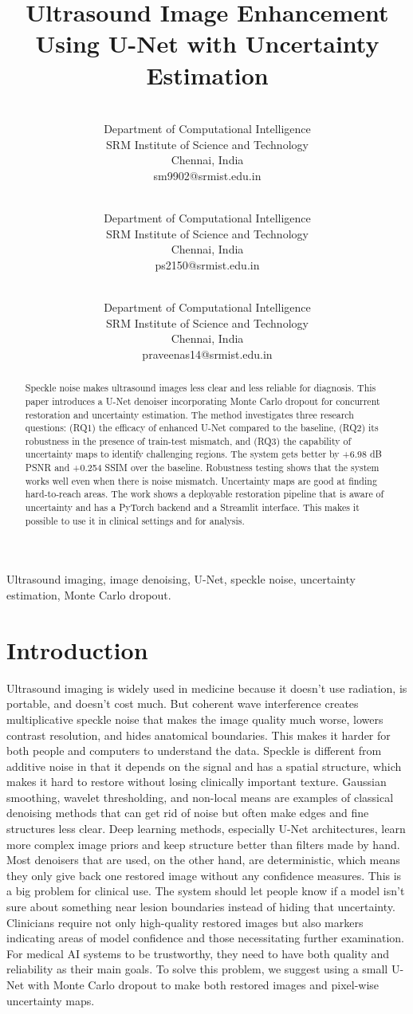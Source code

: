 \documentclass[conference]{IEEEtran}
\title{Ultrasound Image Enhancement Using U-Net with Uncertainty Estimation}
\author{\IEEEauthorblockN{ Swayam Vijay Mehra} \\
{\small Department of Computational Intelligence} \\
{\small SRM Institute of Science and Technology} \\
{\small Chennai, India} \\
{\small sm9902@srmist.edu.in}
\and
\IEEEauthorblockN{ Prateek Shukla} \\
{\small Department of Computational Intelligence} \\
{\small SRM Institute of Science and Technology} \\
{\small Chennai, India} \\
{\small ps2150@srmist.edu.in}
\and
\IEEEauthorblockN{ Praveena S } \\
{\small Department of Computational Intelligence} \\
{\small SRM Institute of Science and Technology} \\
{\small Chennai, India} \\
{\small praveenas14@srmist.edu.in}}
\begin{document}
\maketitle

\begin{abstract}
Speckle noise makes ultrasound images less clear and less reliable for diagnosis. This paper introduces a U-Net denoiser incorporating Monte Carlo dropout for concurrent restoration and uncertainty estimation. The method investigates three research questions: (RQ1) the efficacy of enhanced U-Net compared to the baseline, (RQ2) its robustness in the presence of train-test mismatch, and (RQ3) the capability of uncertainty maps to identify challenging regions. The system gets better by +6.98 dB PSNR and +0.254 SSIM over the baseline. Robustness testing shows that the system works well even when there is noise mismatch. Uncertainty maps are good at finding hard-to-reach areas. The work shows a deployable restoration pipeline that is aware of uncertainty and has a PyTorch backend and a Streamlit interface. This makes it possible to use it in clinical settings and for analysis.
\end{abstract}

\begin{IEEEkeywords}
Ultrasound imaging, image denoising, U-Net, speckle noise, uncertainty estimation, Monte Carlo dropout.
\end{IEEEkeywords}

\section{Introduction}
Ultrasound imaging is widely used in medicine because it doesn't use radiation, is portable, and doesn't cost much. But coherent wave interference creates multiplicative speckle noise that makes the image quality much worse, lowers contrast resolution, and hides anatomical boundaries. This makes it harder for both people and computers to understand the data. Speckle is different from additive noise in that it depends on the signal and has a spatial structure, which makes it hard to restore without losing clinically important texture. Gaussian smoothing, wavelet thresholding, and non-local means are examples of classical denoising methods that can get rid of noise but often make edges and fine structures less clear. Deep learning methods, especially U-Net architectures, learn more complex image priors and keep structure better than filters made by hand. Most denoisers that are used, on the other hand, are deterministic, which means they only give back one restored image without any confidence measures. This is a big problem for clinical use. The system should let people know if a model isn't sure about something near lesion boundaries instead of hiding that uncertainty. Clinicians require not only high-quality restored images but also markers indicating areas of model confidence and those necessitating further examination. For medical AI systems to be trustworthy, they need to have both quality and reliability as their main goals. To solve this problem, we suggest using a small U-Net with Monte Carlo dropout to make both restored images and pixel-wise uncertainty maps. 
\end{document}
